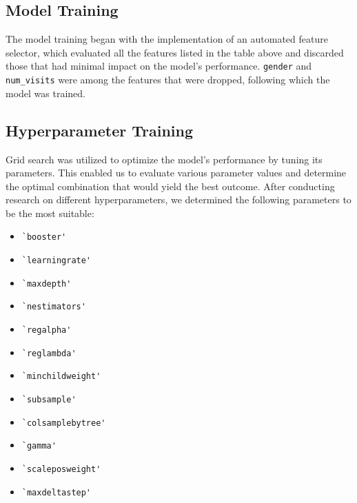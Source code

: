 \documentclass{article}
\begin{document}
\subsection{Model Training}
\begin{flushleft} 
The model training began with the implementation of an automated feature selector, which evaluated all the features listed in the table above and discarded those that had minimal impact on the model's performance.
\verb+gender+ and \verb+num_visits+ were among the features that were dropped, following which the model was trained. 
\end{flushleft}

\clearpage
\subsection{Hyperparameter Training}
\begin{flushleft}  
Grid search was utilized to optimize the model's performance by tuning its parameters.
This enabled us to evaluate various parameter values and determine the optimal combination that would yield the best outcome.
After conducting research on different hyperparameters, we determined the following parameters to be the most suitable:
\begin{itemize}
    \item \verb+`booster'+
    \item \verb+`learningrate'+
    \item \verb+`maxdepth'+
    \item \verb+`nestimators'+
    \item \verb+`regalpha'+
    \item \verb+`reglambda'+
    \item \verb+`minchildweight'+
    \item \verb+`subsample'+
    \item \verb+`colsamplebytree'+
    \item \verb+`gamma'+
    \item \verb+`scaleposweight'+
    \item \verb+`maxdeltastep'+
\end{itemize} 
\end{flushleft}
\end{document}
